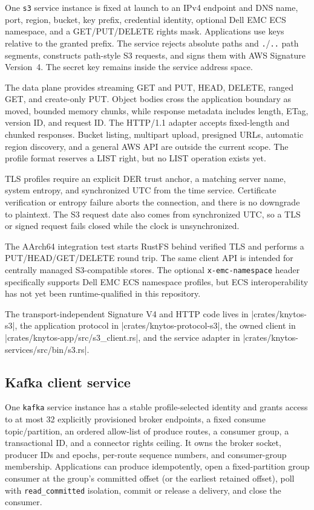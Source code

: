 One \texttt{s3} service instance is fixed at launch to an IPv4 endpoint and
DNS name, port, region, bucket, key prefix, credential identity, optional Dell
EMC ECS namespace, and a GET/PUT/DELETE rights mask. Applications use keys
relative to the granted prefix. The service rejects absolute paths and
\texttt{.}/\texttt{..} path segments, constructs path-style S3 requests, and
signs them with AWS Signature Version~4. The secret key remains inside the
service address space.

The data plane provides streaming GET and PUT, HEAD, DELETE, ranged GET, and
create-only PUT. Object bodies cross the application boundary as moved,
bounded memory chunks, while response metadata includes length, ETag, version ID,
and request ID. The HTTP/1.1 adapter accepts fixed-length and chunked
responses. Bucket listing, multipart upload, presigned URLs, automatic region
discovery, and a general AWS API are outside the current scope. The profile
format reserves a LIST right, but no LIST operation exists yet.

TLS profiles require an explicit DER trust anchor, a matching server name,
system entropy, and synchronized UTC from the time service. Certificate
verification or entropy failure aborts the connection, and there is no downgrade
to plaintext. The S3 request date also comes from synchronized UTC, so a TLS
or signed request fails closed while the clock is unsynchronized.

The AArch64 integration test starts RustFS behind verified TLS and performs a
PUT/HEAD/GET/DELETE round trip. The same client API is intended for
centrally managed S3-compatible stores. The optional
\texttt{x-emc-namespace} header specifically supports Dell EMC ECS namespace
profiles, but ECS interoperability has not yet been runtime-qualified in this
repository.

The transport-independent Signature V4 and HTTP code lives in
\repodir|crates/knytos-s3|, the application protocol in
\repodir|crates/knytos-protocol-s3|, the owned client in
\repofile|crates/knytos-app/src/s3_client.rs|, and the service adapter in
\repofile|crates/knytos-services/src/bin/s3.rs|.

\subsection{Kafka client service}
\label{sec:kafka-service}

One \texttt{kafka} service instance has a stable profile-selected identity and
grants access to at most 32 explicitly provisioned broker endpoints, a fixed
consume topic/partition, an ordered allow-list of produce routes, a consumer
group, a transactional ID, and a connector rights ceiling. It owns the broker socket,
producer IDs and epochs, per-route sequence numbers, and consumer-group
membership. Applications can produce idempotently, open a fixed-partition group
consumer at the group's committed offset (or the earliest retained offset),
poll with \texttt{read\_committed} isolation, commit or release a delivery, and
close the consumer.

